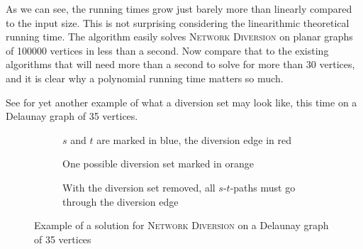 \begin{center}
        
\end{center}

As we can see, the running times grow just barely more than linearly compared to the input size. This is not surprising considering the linearithmic theoretical running time. The algorithm easily solves \textsc{Network Diversion} on planar graphs of 100000 vertices in less than a second. Now compare that to the existing algorithms that will need more than a second to solve for more than 30 vertices, and it is clear why a polynomial running time matters so much.

See  for yet another example of what a diversion set may look like, this time on a Delaunay graph of 35 vertices.

\noindent
\begin{figure}
    \centering
    \begin{subfigure}{.32\textwidth}
        \centering
        
        \caption{$s$ and $t$ are marked in blue, the diversion edge in red}
        \label{subfigure:network-diversion-input}
    \end{subfigure}\hfill%
    \begin{subfigure}{.32\textwidth}
        \centering
        
        \caption{One possible diversion set marked in orange}
        \label{subfigure:network-diversion-diversion}
    \end{subfigure}\hfill%
    \begin{subfigure}{.32\textwidth}
        \centering
        
        \caption{With the diversion set removed, all $s$-$t$-paths must go through the diversion edge}
        \label{subfigure:network-diversion-diverted}
    \end{subfigure}
    \caption{Example of a solution for \textsc{Network Diversion} on a Delaunay graph of 35 vertices}
    \label{figure:network-diversion-on-delaunay}
\end{figure}
